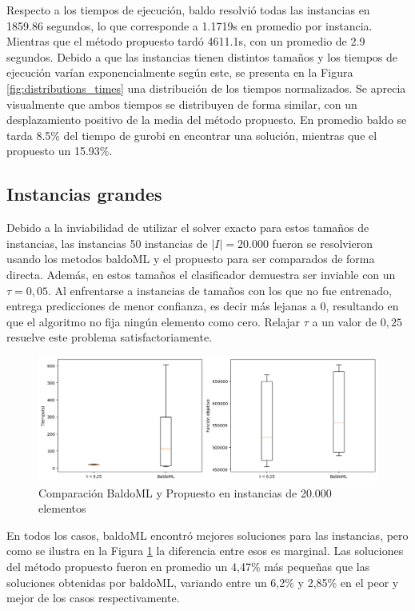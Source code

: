 \documentclass[spanish, a4paper, 12pt, openany,final]{book}
\begin{document}
Respecto a los tiempos de ejecución, baldo resolvió todas las instancias en 1859.86 segundos, lo que corresponde a 1.1719s en promedio por instancia. Mientras que el método propuesto tardó 4611.1s, con un promedio de 2.9 segundos. Debido a que las instancias tienen distintos tamaños y los tiempos de ejecución varían exponencialmente según este, se presenta en la Figura \ref{fig:distributions_times} una distribución de los tiempos normalizados. Se aprecia visualmente que ambos tiempos se distribuyen de forma similar, con un desplazamiento positivo de la media del método propuesto. En promedio baldo se tarda 8.5\% del tiempo de gurobi en encontrar una solución, mientras que el propuesto un 15.93\%.



\subsection*{Instancias grandes}


Debido a la inviabilidad de utilizar el solver exacto para estos tamaños de instancias, las instancias 50 instancias de $|I| = 20.000$ fueron se resolvieron usando los metodos baldoML y el propuesto para ser comparados de forma directa. Además, en estos tamaños el clasificador demuestra ser inviable con un $\tau = 0,05$. Al enfrentarse a instancias de tamaños con los que no fue entrenado, entrega predicciones de menor confianza, es decir más lejanas a $0$, resultando en que el algoritmo no fija ningún elemento como cero. Relajar $\tau$ a un valor de $0,25$ resuelve este problema satisfactoriamente.

\begin{figure}[H]
	\includegraphics[scale=0.5]{graphs/comparison.png}	
	\caption{Comparación BaldoML y Propuesto en instancias de 20.000 elementos}
	\label{fig:comparison}
\end{figure}

En todos los casos, baldoML encontró mejores soluciones para las instancias, pero como se ilustra en la Figura \ref{fig:comparison} la diferencia entre esos es marginal. Las soluciones del método propuesto fueron en promedio un 4,47\% más pequeñas que las soluciones obtenidas por baldoML, variando entre un 6,2\% y 2,85\% en el peor y mejor de los casos respectivamente.
\end{document}
